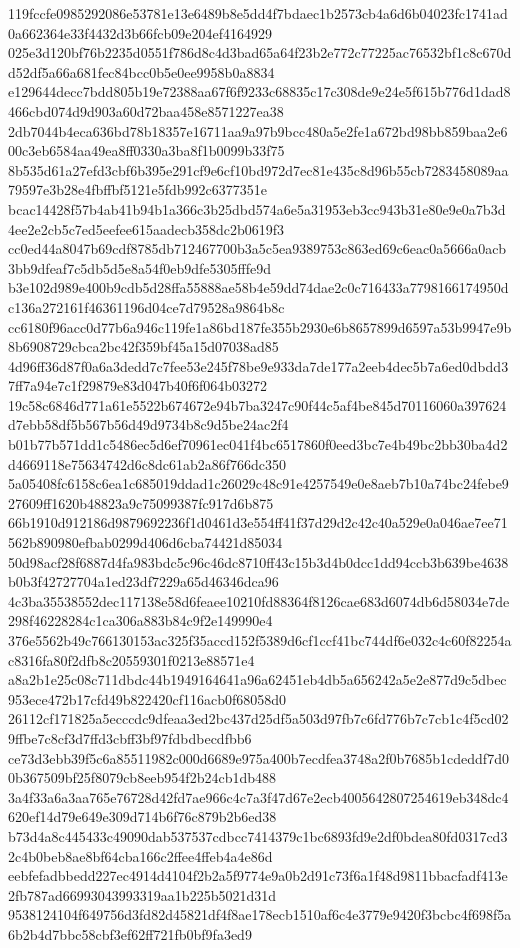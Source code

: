 \documentclass[11pt,a4paper]{article}
\begin{document}
{119fccfe0985292086e53781e13e6489b8e5dd4f7bdaec1b2573cb4a6d6b04023fc1741ad0a662364e33f4432d3b66fcb09e204ef4164929
025e3d120bf76b2235d0551f786d8c4d3bad65a64f23b2e772c77225ac76532bf1c8c670dd52df5a66a681fec84bcc0b5e0ee9958b0a8834
e129644decc7bdd805b19e72388aa67f6f9233c68835c17c308de9e24e5f615b776d1dad8466cbd074d9d903a60d72baa458e8571227ea38
2db7044b4eca636bd78b18357e16711aa9a97b9bcc480a5e2fe1a672bd98bb859baa2e600c3eb6584aa49ea8ff0330a3ba8f1b0099b33f75
8b535d61a27efd3cbf6b395e291cf9e6cf10bd972d7ec81e435c8d96b55cb7283458089aa79597e3b28e4fbffbf5121e5fdb992c6377351e
bcac14428f57b4ab41b94b1a366c3b25dbd574a6e5a31953eb3cc943b31e80e9e0a7b3d4ee2e2cb5c7ed5eefee615aadecb358dc2b0619f3
cc0ed44a8047b69cdf8785db712467700b3a5c5ea9389753c863ed69c6eac0a5666a0acb3bb9dfeaf7c5db5d5e8a54f0eb9dfe5305fffe9d
b3e102d989e400b9cdb5d28ffa55888ae58b4e59dd74dae2c0c716433a7798166174950dc136a272161f46361196d04ce7d79528a9864b8c
cc6180f96acc0d77b6a946c119fe1a86bd187fe355b2930e6b8657899d6597a53b9947e9b8b6908729cbca2bc42f359bf45a15d07038ad85
4d96ff36d87f0a6a3dedd7c7fee53e245f78be9e933da7de177a2eeb4dec5b7a6ed0dbdd37ff7a94e7c1f29879e83d047b40f6f064b03272
19c58c6846d771a61e5522b674672e94b7ba3247c90f44c5af4be845d70116060a397624d7ebb58df5b567b56d49d9734b8c9d5be24ac2f4
b01b77b571dd1c5486ec5d6ef70961ec041f4bc6517860f0eed3bc7e4b49bc2bb30ba4d2d4669118e75634742d6c8dc61ab2a86f766dc350
5a05408fc6158c6ea1c685019ddad1c26029c48c91e4257549e0e8aeb7b10a74bc24febe927609ff1620b48823a9c75099387fc917d6b875
66b1910d912186d9879692236f1d0461d3e554ff41f37d29d2c42c40a529e0a046ae7ee71562b890980efbab0299d406d6cba74421d85034
50d98acf28f6887d4fa983bdc5c96c46dc8710ff43c15b3d4b0dcc1dd94ccb3b639be4638b0b3f42727704a1ed23df7229a65d46346dca96
4c3ba35538552dec117138e58d6feaee10210fd88364f8126cae683d6074db6d58034e7de298f46228284c1ca306a883b84c9f2e149990e4
376e5562b49c766130153ac325f35accd152f5389d6cf1ccf41bc744df6e032c4c60f82254ac8316fa80f2dfb8c20559301f0213e88571e4
a8a2b1e25c08c711dbdc44b1949164641a96a62451eb4db5a656242a5e2e877d9c5dbec953ece472b17cfd49b822420cf116acb0f68058d0
26112cf171825a5ecccdc9dfeaa3ed2bc437d25df5a503d97fb7c6fd776b7c7cb1c4f5cd029ffbe7c8cf3d7ffd3cbff3bf97fdbdbecdfbb6
ce73d3ebb39f5c6a85511982c000d6689e975a400b7ecdfea3748a2f0b7685b1cdeddf7d00b367509bf25f8079cb8eeb954f2b24cb1db488
3a4f33a6a3aa765e76728d42fd7ae966c4c7a3f47d67e2ecb4005642807254619eb348dc4620ef14d79e649e309d714b6f76c879b2b6ed38
b73d4a8c445433c49090dab537537cdbcc7414379c1bc6893fd9e2df0bdea80fd0317cd32c4b0beb8ae8bf64cba166c2ffee4ffeb4a4e86d
eebfefadbbedd227ec4914d4104f2b2a5f9774e9a0b2d91c73f6a1f48d9811bbacfadf413e2fb787ad66993043993319aa1b225b5021d31d
9538124104f649756d3fd82d45821df4f8ae178ecb1510af6c4e3779e9420f3bcbc4f698f5a6b2b4d7bbc58cbf3ef62ff721fb0bf9fa3ed9
}
\end{document}
